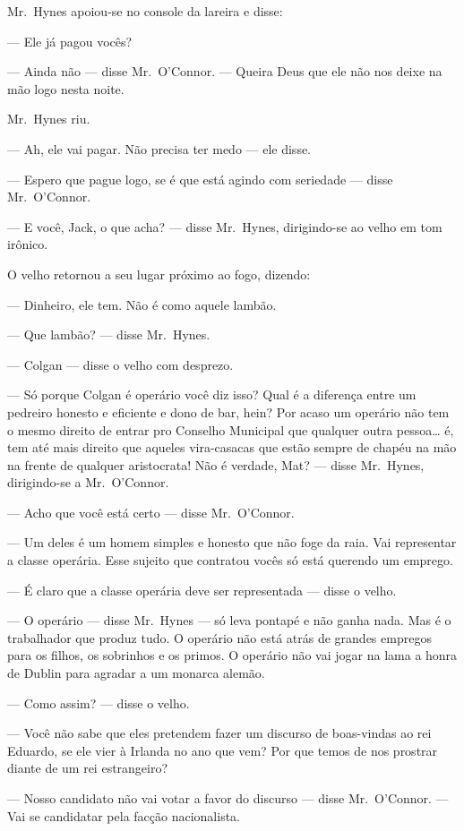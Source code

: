 Mr.~Hynes apoiou-se no console da lareira e disse:

--- Ele já pagou vocês?

--- Ainda não --- disse Mr.~O’Connor.  --- Queira Deus que ele não nos deixe na
mão logo nesta noite.

Mr.~Hynes riu.

--- Ah, ele vai pagar.  Não precisa ter medo --- ele disse.

--- Espero que pague logo, se é que está agindo com seriedade --- disse Mr.~O’Connor.

--- E você, Jack, o que acha? --- disse Mr.~Hynes, dirigindo-se ao velho em tom
irônico.

O velho retornou a seu lugar próximo ao fogo, dizendo:

--- Dinheiro, ele tem.  Não é como aquele lambão.

--- Que lambão? --- disse Mr.~Hynes.

--- Colgan --- disse o velho com desprezo.

--- Só porque Colgan é operário você diz isso?  Qual é a diferença entre um
pedreiro honesto e eficiente e dono de bar, hein?  Por acaso um operário não
tem o mesmo direito de entrar pro Conselho Municipal que qualquer outra
pessoa\ldots{} é, tem até mais direito que aqueles vira-casacas que estão
sempre de chapéu na mão na frente de qualquer aristocrata!  Não é verdade, Mat?
--- disse Mr.~Hynes, dirigindo-se a Mr.~O’Connor.

--- Acho que você está certo --- disse Mr.~O’Connor.

--- Um deles é um homem simples e honesto que não foge da raia.  Vai
representar a classe operária.  Esse sujeito que contratou vocês só está
querendo um emprego.

--- É claro que a classe operária deve ser representada --- disse o velho.

--- O operário --- disse Mr.~Hynes --- só leva pontapé e não ganha nada.  Mas é
o trabalhador que produz tudo.  O operário não está atrás de grandes empregos
para os filhos, os sobrinhos e os primos.  O operário não vai jogar na lama a
honra de Dublin para agradar a um monarca alemão.

--- Como assim? --- disse o velho.

--- Você não sabe que eles pretendem fazer um discurso de boas-vindas ao rei
Eduardo, se ele vier à Irlanda no ano que vem?  Por que temos de nos prostrar
diante de um rei estrangeiro?

--- Nosso candidato não vai votar a favor do discurso --- disse Mr.~O’Connor.
--- Vai se candidatar pela facção nacionalista.

